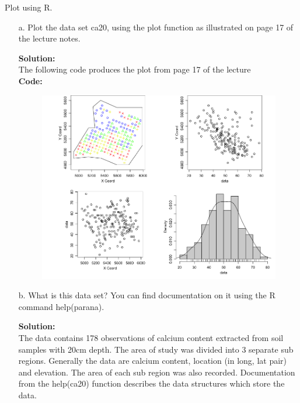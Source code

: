 \documentclass[12pt]{article}
\makeatletter
\theoremstyle{homework}
\newenvironment{exercise}[1]
{\def\@currentlabel{#1}\exercisecore}
{\endexercisecore}
\newcommand{\localhead}[1]{\par\smallskip\noindent\textbf{#1}\nobreak\\}%
\newcommand\solution{\localhead{Solution:}}
\makeatother
\begin{document}
\begin{exercise}{2} Plot using R.
    \begin{enumerate}
        \item[a.] Plot the data set ca20, using the plot function as illustrated on page 17 of the lecture notes.\\
        \solution The following code produces the plot from page 17 of the lecture \\
        \textbf{Code:}
        \begin{center}
        
        \end{center}
        \begin{figure}[H]
          \begin{center}
          \includegraphics[width = \textwidth]{Rplot.png}
          \end{center}
        \end{figure}


        \item[b.] What is this data set? You can find documentation on it using the R command help(parana).\\
        \solution The data contains 178 observations of calcium content extracted from soil samples with 20cm depth. The area 
        of study was divided into 3 separate sub regions. Generally the data are calcium content, location (in long, lat pair) and elevation. The 
        area of each sub region was also recorded. Documentation from the help(ca20) function describes the data structures which store the data.
        \vspace{.15in}


\end{enumerate}
\end{exercise}
\end{document}
